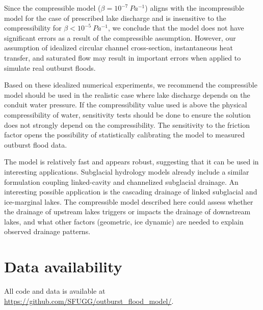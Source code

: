 \documentclass[11pt]{article}
\begin{document}
Since the compressible model ($\beta = 10^{-7}\SI{}{Pa^{-1}}$) aligns with the incompressible model for the case of prescribed lake discharge and is insensitive to the compressibility for $\beta < 10^{-5}\SI{}{Pa^{-1}}$, we conclude that the model does not have significant errors as a result of the compressible assumption. However, our assumption of idealized circular channel cross-section, instantaneous heat transfer, and saturated flow may result in important errors when applied to simulate real outburst floods.

Based on these idealized numerical experiments, we recommend the compressible model should be used in the realistic case where lake discharge depends on the conduit water pressure. If the compressibility value used is above the physical compressibility of water, sensitivity tests should be done to ensure the solution does not strongly depend on the compressibility. The sensitivity to the friction factor opens the possibility of statistically calibrating the model to measured outburst flood data.

The model is relatively fast and appears robust, suggesting that it can be used in interesting applications. Subglacial hydrology models \citep[e.g.][]{werder2013} already include a similar formulation coupling linked-cavity and channelized subglacial drainage. An interesting possible application is the cascading drainage of linked subglacial and ice-marginal lakes. The compressible model described here could assess whether the drainage of upstream lakes triggers or impacts the drainage of downstream lakes, and what other factors (geometric, ice dynamic) are needed to explain observed drainage patterns.

\section*{Data availability}
All code and data is available at \url{https://github.com/SFUGG/outburst_flood_model/}.




\clearpage
\appendix
\end{document}
